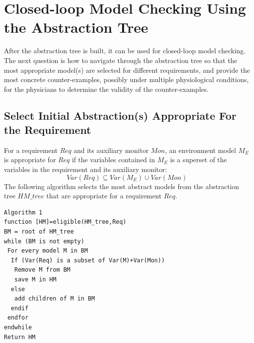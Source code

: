 \section{Closed-loop Model Checking Using the Abstraction Tree}
After the abstraction tree is built, it can be used for closed-loop model checking. The next question is how to navigate through the abstraction tree so that the most appropriate model(s) are selected for different requirements, and provide the most concrete counter-examples, possibly under multiple physiological conditions, for the physicians to determine the validity of the counter-examples. %
\subsection{Select Initial Abstraction(s) Appropriate For the Requirement}
For a requirement $Req$ and its auxiliary monitor $Mon$, an environment model $M_E$ is appropriate for $Req$ if the variables contained in $M_E$ is a superset of the variables in the requirement and its auxiliary monitor: 
$$Var(Req)\subseteq Var(M_E)\cup Var(Mon)$$
The following algorithm selects the most abstract models from the abstraction tree $HM\_tree$ that are appropriate for a requirement $Req$.
\begin{Verbatim}
Algorithm 1
function [HM]=eligible(HM_tree,Req)
BM = root of HM_tree
while (BM is not empty)
 For every model M in BM
  If (Var(Req) is a subset of Var(M)+Var(Mon))
   Remove M from BM
   save M in HM
  else
   add children of M in BM
  endif
 endfor
endwhile
Return HM
\end{Verbatim}
